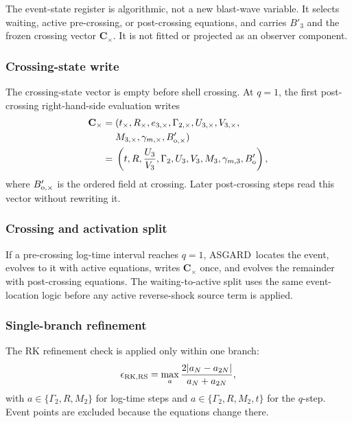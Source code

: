 \documentclass[twocolumn]{aastex702}
\newcommand{\asgard}{\textsc{ASGARD}}
\begin{document}
The event-state register is algorithmic, not a new blast-wave variable.  It
selects waiting, active pre-crossing, or post-crossing equations, and carries
\(B'_3\) and the frozen crossing vector \(\mathbf C_\times\).  It is not fitted
or projected as an observer component.

\subsubsection{Crossing-state write}

The crossing-state vector is empty before shell crossing.  At \(q=1\), the first
post-crossing right-hand-side evaluation writes
\begin{equation}
\begin{aligned}
\mathbf C_\times={}&(t_\times,R_\times,e_{3,\times},\Gamma_{2,\times},
U_{3,\times},V_{3,\times},\\
&M_{3,\times},\gamma_{m,\times},B'_{{\rm o},\times})\\
={}&\left(t,R,\frac{U_3}{V_3},\Gamma_2,U_3,V_3,
M_3,\gamma_{m,3},B'_{\rm o}\right),
\end{aligned}
\end{equation}
where \(B'_{{\rm o},\times}\) is the ordered field at crossing.  Later
post-crossing steps read this vector without rewriting it.

\subsubsection{Crossing and activation split}

If a pre-crossing log-time interval reaches \(q=1\), \asgard\ locates the event,
evolves to it with active equations, writes \(\mathbf C_\times\) once, and evolves
the remainder with post-crossing equations.  The waiting-to-active split uses the
same event-location logic before any active reverse-shock source term is applied.

\subsubsection{Single-branch refinement}

The RK refinement check is applied only within one branch:
\begin{equation}
\epsilon_{\rm RK,RS}=\max_a\frac{2|a_N-a_{2N}|}{a_N+a_{2N}},
\end{equation}
with \(a\in\{\Gamma_2,R,M_2\}\) for log-time steps and
\(a\in\{\Gamma_2,R,M_2,t\}\) for the \(q\)-step.  Event points are excluded
because the equations change there.
\end{document}
